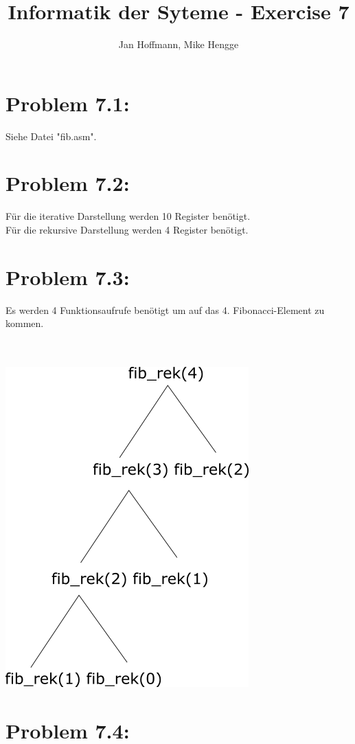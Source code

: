 \documentclass[10pt,a4paper]{article}
\title{Informatik der Syteme - Exercise 7}
\author{Jan Hoffmann, Mike Hengge}
\begin{document}
\section*{Problem 7.1:}
	\item Siehe Datei "fib.asm".
\section*{Problem 7.2:}
	\item Für die iterative Darstellung werden 10 Register benötigt. \\
				Für die rekursive Darstellung werden 4 Register benötigt.
	
\section*{Problem 7.3:}
	\item Es werden 4 Funktionsaufrufe benötigt um auf das 4. Fibonacci-Element zu kommen. \\\\\\
	\begin{minipage}[t]{0.4\linewidth}				
						\includegraphics[scale=0.25]{baumstruktur.png}
					\end{minipage}	
\section*{Problem 7.4:}
\end{document}

